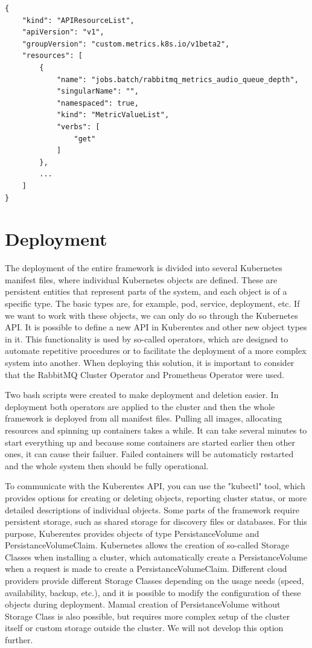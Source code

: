 \begin{lstlisting}[caption={Result of calling the command to get metrics},label={list:kubectl_metrics}]
{
    "kind": "APIResourceList",
    "apiVersion": "v1",
    "groupVersion": "custom.metrics.k8s.io/v1beta2",
    "resources": [
        {
            "name": "jobs.batch/rabbitmq_metrics_audio_queue_depth",
            "singularName": "",
            "namespaced": true,
            "kind": "MetricValueList",
            "verbs": [
                "get"
            ]
        },
        ...
    ]
}
\end{lstlisting}


\section{Deployment}
\label{section:deployment}

The deployment of the entire framework is divided into several Kubernetes manifest files, where individual Kubernetes objects are defined. These are persistent entities that represent parts of the system, and each object is of a specific type. The basic types are, for example, pod, service, deployment, etc. If we want to work with these objects, we can only do so through the Kubernetes API. It is possible to define a new API in Kuberentes and other new object types in it. This functionality is used by so-called operators, which are designed to automate repetitive procedures or to facilitate the deployment of a more complex system into another. When deploying this solution, it is important to consider that the RabbitMQ Cluster Operator and Prometheus Operator were used.

Two bash scripts were created to make deployment and deletion easier. In deployment both operators are applied to the cluster and then the whole framework is deployed from all manifest files. Pulling all images, allocating resources and spinning up containers takes a while. It can take several minutes to start everything up and because some containers are started earlier then other ones, it can cause their failuer. Failed containers will be automaticly restarted and the whole system then should be fully operational. 

To communicate with the Kuberentes API, you can use the "kubectl" tool, which provides options for creating or deleting objects, reporting cluster status, or more detailed descriptions of individual objects. Some parts of the framework require persistent storage, such as shared storage for discovery files or databases. For this purpose, Kuberentes provides objects of type PersistanceVolume and PersistanceVolumeClaim. Kubernetes allows the creation of so-called Storage Classes when installing a cluster, which automatically create a PersistanceVolume when a request is made to create a PersistanceVolumeClaim. Different cloud providers provide different Storage Classes depending on the usage needs (speed, availability, backup, etc.), and it is possible to modify the configuration of these objects during deployment. Manual creation of PersistanceVolume without Storage Class is also possible, but requires more complex setup of the cluster itself or custom storage outside the cluster. We will not develop this option further.

